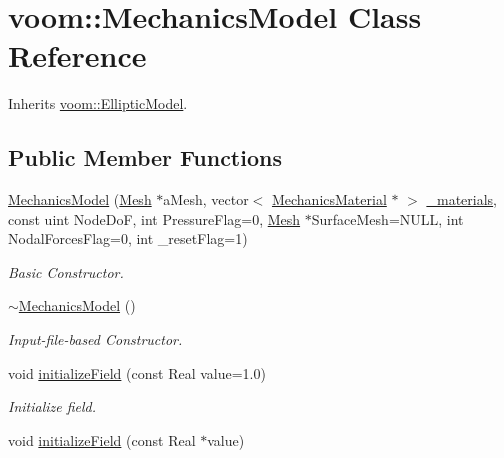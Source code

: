 \hypertarget{classvoom_1_1_mechanics_model}{
\section{voom::MechanicsModel Class Reference}
\label{classvoom_1_1_mechanics_model}
}


Inherits \hyperlink{classvoom_1_1_elliptic_model}{voom::EllipticModel}.\subsection*{Public Member Functions}
\begin{DoxyCompactItemize}
\item 
\hyperlink{classvoom_1_1_mechanics_model_add7088e6811b40dbfe55e32552fc2a10}{MechanicsModel} (\hyperlink{classvoom_1_1_mesh}{Mesh} $\ast$aMesh, vector$<$ \hyperlink{classvoom_1_1_mechanics_material}{MechanicsMaterial} $\ast$ $>$ \hyperlink{classvoom_1_1_mechanics_model_abdba86a197a3e053f7fc3d98a4c35e8d}{\_\-materials}, const uint NodeDoF, int PressureFlag=0, \hyperlink{classvoom_1_1_mesh}{Mesh} $\ast$SurfaceMesh=NULL, int NodalForcesFlag=0, int \_\-resetFlag=1)
\begin{DoxyCompactList}\small\item\em Basic Constructor. \item\end{DoxyCompactList}\item 
\hyperlink{classvoom_1_1_mechanics_model_a39cab4fab5f26d8bf83e63a6d91e33f6}{$\sim$MechanicsModel} ()
\begin{DoxyCompactList}\small\item\em Input-\/file-\/based Constructor. \item\end{DoxyCompactList}\item 
\hypertarget{classvoom_1_1_mechanics_model_a5315460244606255a586557fcd8d3020}{
void \hyperlink{classvoom_1_1_mechanics_model_a5315460244606255a586557fcd8d3020}{initializeField} (const Real value=1.0)}
\label{classvoom_1_1_mechanics_model_a5315460244606255a586557fcd8d3020}

\begin{DoxyCompactList}\small\item\em Initialize field. \item\end{DoxyCompactList}\item 
\hypertarget{classvoom_1_1_mechanics_model_a00dcb774c75d337aea3a3396d2ce15f5}{
void \hyperlink{classvoom_1_1_mechanics_model_a00dcb774c75d337aea3a3396d2ce15f5}{initializeField} (const Real $\ast$value)}
\label{classvoom_1_1_mechanics_model_a00dcb774c75d337aea3a3396d2ce15f5}


\end{DoxyCompactItemize}

